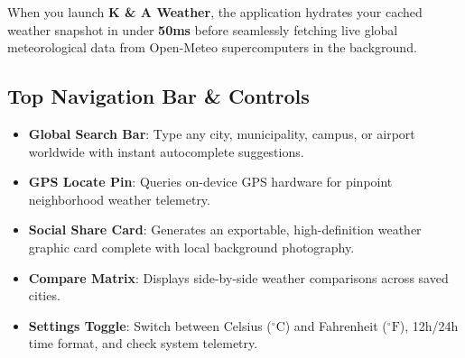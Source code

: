\documentclass[11pt,a4paper]{article}
\begin{document}
When you launch \textbf{K \& A Weather}, the application hydrates your cached weather snapshot in under \textbf{50ms} before seamlessly fetching live global meteorological data from Open-Meteo supercomputers in the background.

\subsection{Top Navigation Bar \& Controls}
\begin{itemize}[leftmargin=1.5em, itemsep=2pt]
  \item \textbf{Global Search Bar}: Type any city, municipality, campus, or airport worldwide with instant autocomplete suggestions.
  \item \textbf{GPS Locate Pin}: Queries on-device GPS hardware for pinpoint neighborhood weather telemetry.
  \item \textbf{Social Share Card}: Generates an exportable, high-definition weather graphic card complete with local background photography.
  \item \textbf{Compare Matrix}: Displays side-by-side weather comparisons across saved cities.
  \item \textbf{Settings Toggle}: Switch between Celsius ($^\circ\text{C}$) and Fahrenheit ($^\circ\text{F}$), 12h/24h time format, and check system telemetry.
\end{itemize}
\end{document}
